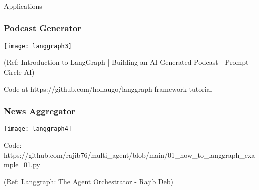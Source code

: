 \begin{frame}[fragile]\frametitle{}
\begin{center}
{\Large Applications}
\end{center}
\end{frame}


\begin{frame}\frametitle{Podcast Generator}

\begin{center}
\texttt{[image: langgraph3]}
\end{center}	  


{\tiny (Ref: Introduction to LangGraph | Building an AI Generated Podcast - Prompt Circle AI)}

Code at https://github.com/hollaugo/langgraph-framework-tutorial
\end{frame}


\begin{frame}[fragile]\frametitle{News Aggregator}

\begin{center}
\texttt{[image: langgraph4]}
\end{center}	

Code: https://github.com/rajib76/multi\_agent/blob/main/01\_how\_to\_langgraph\_example\_01.py

{\tiny (Ref: Langgraph: The Agent Orchestrator - Rajib Deb)}


\end{frame}